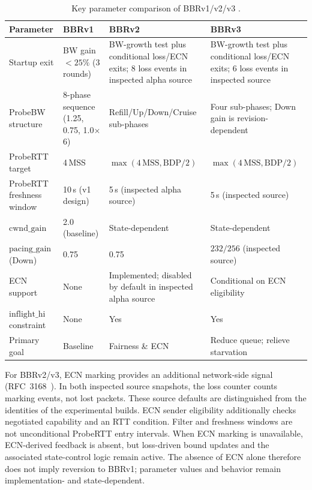 \documentclass[a4paper,fleqn]{cas-sc}
\begin{document}
\begin{table}[pos=tbp]
  \caption{Key parameter comparison of BBRv1/v2/v3
    \citep{cardwell2017bbr,cardwell2019bbrv2,cardwell2023bbrv3,abrol2026bbr}.}
  \label{tab:versions}
  \small
  \begin{threeparttable}
  \begin{tabularx}{\tblwidth}{@{}p{2.8cm}XXX@{}}
    \toprule
    \textbf{Parameter} & \textbf{BBRv1} & \textbf{BBRv2} & \textbf{BBRv3} \\
    \midrule
    Startup exit &
      BW gain ${<}25\%$ (3 rounds) &
      BW-growth test plus conditional loss/ECN exits; 8 loss events in inspected alpha source &
      BW-growth test plus conditional loss/ECN exits; 6 loss events in inspected source \\
    \midrule
    ProbeBW structure &
      8-phase sequence (1.25, 0.75, 1.0$\times$6) &
      Refill/Up/Down/Cruise sub-phases &
      Four sub-phases; Down gain is revision-dependent \\
    \midrule
    ProbeRTT target     & 4\,MSS    & $\max(4\,\mathrm{MSS},\mathrm{BDP}/2)$ & $\max(4\,\mathrm{MSS},\mathrm{BDP}/2)$ \\
    ProbeRTT freshness window & 10\,s (v1 design) & 5\,s (inspected alpha source) & 5\,s (inspected source)  \\
    $\mathrm{cwnd\_gain}$ & 2.0 (baseline) & State-dependent & State-dependent \\
    $\mathrm{pacing\_gain}$ (Down) & 0.75 & 0.75 & $232/256$ (inspected source) \\
    ECN support & None & Implemented; disabled by default in inspected alpha source & Conditional on ECN eligibility \\
    $\mathrm{inflight\_hi}$ constraint & None & Yes & Yes \\
    Primary goal & Baseline & Fairness \& ECN & Reduce queue; relieve starvation \\
    \bottomrule
  \end{tabularx}
  \begin{tablenotes}
    \small
    \item For BBRv2/v3, ECN marking provides an additional network-side signal (RFC~3168~\citep{rfc3168}).
    In both inspected source snapshots, the loss counter counts marking events, not lost packets.
    These source defaults are distinguished from the identities of the experimental builds.
    ECN sender eligibility additionally checks negotiated capability and an RTT condition.
    Filter and freshness windows are not unconditional ProbeRTT entry intervals.
    When ECN marking is unavailable, ECN-derived feedback is absent, but loss-driven
    bound updates and the associated state-control logic remain active. The absence
    of ECN alone therefore does not imply reversion to BBRv1; parameter values and
    behavior remain implementation- and state-dependent.
  \end{tablenotes}
  \end{threeparttable}
\end{table}
\end{document}
